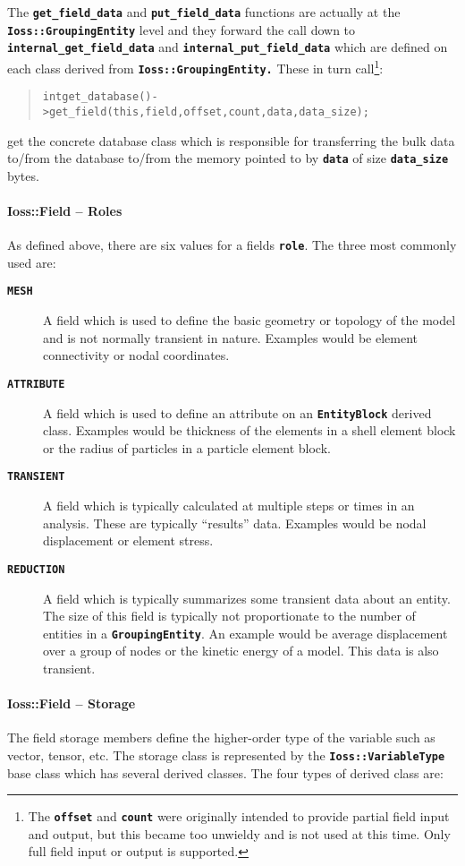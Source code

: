\documentclass[11pt,twoside]{article}
\newcommand{\code}[1]
   {\mbox{\bf\tt #1}\null}
\newenvironment{source}
{\small\begin{quote}\begin{alltt}}
{\end{alltt}\end{quote}\normalsize}
\begin{document}
The \code{get\_field\_data} and
\code{put\_field\_data} functions are actually at
the\code{ Ioss::GroupingEntity} level and they forward the
call down to \code{internal\_get\_field\_data} and
\code{internal\_put\_field\_data} which are defined on each
class derived from \code{Ioss::GroupingEntity.} These in turn
call\footnote{The \code{offset} and \code{count}
were originally intended to provide partial field input and output, but
this became too unwieldy and is not used at this time. Only full field
input or output is supported.}:
\begin{source}
int get\_database(){}-{\textgreater}get\_field(this, field, offset, count, data, data\_size);
\end{source}

get the concrete database class which is responsible for transferring
the bulk data to/from the database to/from the memory pointed to by
\code{data} of size \code{data\_size} bytes.

\paragraph{Ioss::Field -- Roles}
As defined above, there are six values for a fields
\code{role}. The three most commonly used are:

\begin{description}
\item [\code{MESH}] A field which is used to define the basic
geometry or topology of the model and is not normally transient in
nature. Examples would be element connectivity or nodal coordinates.
\item [\code{ATTRIBUTE}] A field which is used to define an attribute
on an \code{EntityBlock} derived class.  Examples would be thickness
of the elements in a shell element block or the radius of particles in
a particle element block. 
\item [\code{TRANSIENT}] A field which is typically calculated
at multiple steps or times in an analysis. These are typically
``results'' data. Examples would be nodal displacement or element
stress.
\item [\code{REDUCTION}] A field which is typically summarizes
some transient data about an entity. The size of this field is
typically not proportionate to the number of entities in a
\code{GroupingEntity}. An example would be average
displacement over a group of nodes or the kinetic energy of a model.
This data is also transient.
\end{description}
\paragraph{Ioss::Field -- Storage}
The field storage members define the higher{}-order type of the variable
such as vector, tensor, etc. The storage class is represented by the
\code{Ioss::VariableType} base class which has several
derived classes. The four types of derived class are:
\end{document}
